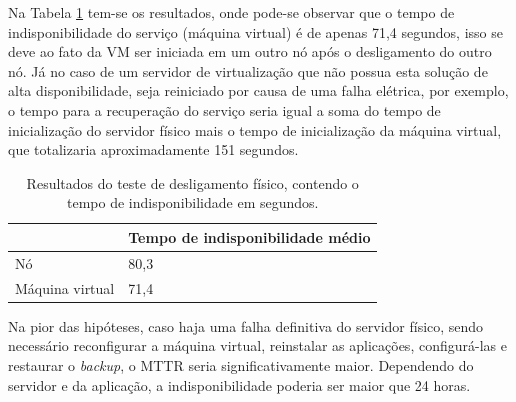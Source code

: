 Na Tabela \ref{tab:teste1resultados} tem-se os resultados, onde pode-se observar que o tempo de indisponibilidade do serviço (máquina virtual) 
é de apenas 71,4 segundos, isso se deve ao fato da \ac{VM} ser iniciada em um outro nó após o desligamento do outro nó. 
Já no caso de um servidor de virtualização que não possua esta solução de alta disponibilidade, seja reiniciado por causa de uma falha elétrica, 
por exemplo, o tempo para a recuperação do serviço seria igual a soma do tempo de inicialização do servidor físico mais o tempo de inicialização 
da máquina virtual, que totalizaria aproximadamente 151 segundos. 



\begin{table}[h!]
\caption{Resultados do teste de desligamento físico, contendo o tempo de indisponibilidade em segundos.}
\small
\label{tab:teste1resultados}
\begin{center}
\begin{tabular}{|l|l|}\hline
 & \textbf{Tempo de indisponibilidade médio} \\\hline %
Nó & 80,3 \\\hline %
Máquina virtual & 71,4 \\\hline %
\end{tabular}
\end{center}
\end{table}

Na pior das hipóteses, caso haja uma falha definitiva do servidor físico, sendo necessário reconfigurar a máquina virtual, reinstalar as aplicações,
configurá-las e restaurar o \textit{backup}, o \ac{MTTR} seria significativamente maior. Dependendo do servidor e da aplicação, 
a indisponibilidade poderia ser maior que 24 horas.


